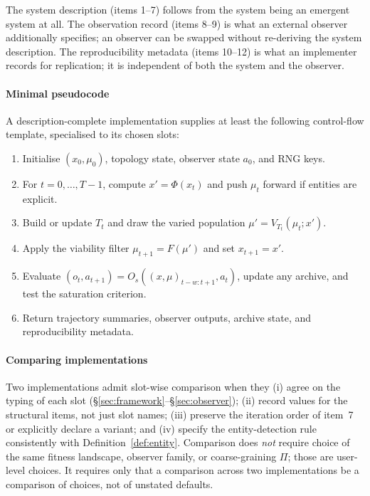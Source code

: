 \documentclass[journal]{IEEEtran}
\theoremstyle{plain}
\theoremstyle{definition}
\theoremstyle{plain}
\begin{document}
The system description (items 1--7) follows from the system being an
emergent system at all. The observation record (items 8--9) is what
an external observer additionally specifies; an observer can be
swapped without re-deriving the system description. The
reproducibility metadata (items 10--12) is what an implementer
records for replication; it is independent of both the system and
the observer.

\paragraph{Minimal pseudocode}
A description-complete implementation supplies at least the following
control-flow template, specialised to its chosen slots:
\begin{enumerate}[leftmargin=2em,itemsep=2pt]
  \item Initialise $(x_0,\mu_0)$, topology state, observer state $a_0$, and
    RNG keys.
  \item For $t=0,\ldots,T-1$, compute $x'=\Phi(x_t)$ and push $\mu_t$
    forward if entities are explicit.
  \item Build or update $T_t$ and draw the varied population
    $\mu' = V_{T_t}(\mu_t;x')$.
  \item Apply the viability filter $\mu_{t+1}=F(\mu')$ and set
    $x_{t+1}=x'$.
  \item Evaluate $(o_t,a_{t+1})=O_s((x,\mu)_{t-w:t+1},a_t)$,
    update any archive, and test the saturation criterion.
  \item Return trajectory summaries, observer outputs, archive
    state, and reproducibility metadata.
\end{enumerate}

\paragraph{Comparing implementations}
Two implementations admit slot-wise comparison when they (i) agree on the
typing of each slot (\S\ref{sec:framework}--\S\ref{sec:observer}); (ii)
record values for the structural items, not just slot names; (iii)
preserve the iteration order of item~7 or explicitly declare a variant;
and (iv) specify the entity-detection rule consistently with
Definition~\ref{def:entity}. Comparison does \emph{not} require choice of
the same fitness landscape, observer family, or coarse-graining $\Pi$;
those are user-level choices. It requires only that a comparison across
two implementations be a comparison of choices, not of unstated defaults.
\end{document}
